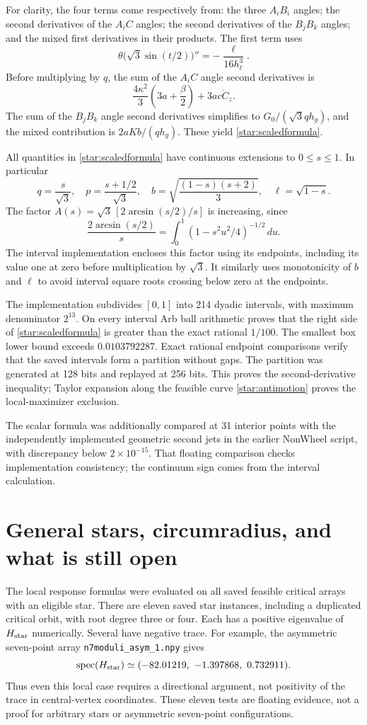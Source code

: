 \documentclass[11pt]{article}
\theoremstyle{remark}\newtheorem{remark}[theorem]{Remark}
\begin{document}
For clarity, the four terms come respectively from: the three
$A_iB_i$ angles; the second derivatives of the $A_iC$ angles; the
second derivatives of the $B_jB_k$ angles; and the mixed first
derivatives in their products. The first term uses
\[
 \theta\bigl(\sqrt3\sin(t/2)\bigr)''
 =-\frac{\ell}{16h_\ell^3}.
\]
Before multiplying by $q$, the sum of the $A_iC$ angle second
derivatives is
\[
 \frac{4\kappa^2}{3}\left(3a+\frac\beta2\right)
 +3ac\ddot C_z.
\]
The sum of the $B_jB_k$ angle second derivatives simplifies to
$G_0/(\sqrt3q h_g)$, and the mixed contribution is
$2aKb/(q h_g)$. These yield \eqref{star:scaledformula}.

All quantities in \eqref{star:scaledformula} have continuous extensions
to $0\leq s\leq1$. In particular
\[
 q=\frac{s}{\sqrt3},\quad p=\frac{s+1/2}{\sqrt3},\quad
 b=\sqrt{\frac{(1-s)(s+2)}3},\quad \ell=\sqrt{1-s}.
\]
The factor $A(s)=\sqrt3\,[2\arcsin(s/2)/s]$ is increasing, since
\[
 \frac{2\arcsin(s/2)}s
 =\int_0^1(1-s^2u^2/4)^{-1/2}\,du.
\]
The interval implementation encloses this factor using its endpoints,
including its value one at zero before multiplication by $\sqrt3$.
It similarly uses monotonicity of $b$ and $\ell$ to avoid interval
square roots crossing below zero at the endpoints.

The implementation subdivides $[0,1]$ into 214 dyadic intervals, with
maximum denominator $2^{13}$. On every interval Arb ball arithmetic
proves that the right side of \eqref{star:scaledformula} is greater than
the exact rational $1/100$. The smallest box lower bound exceeds
$0.0103792287$. Exact rational endpoint comparisons verify that the
saved intervals form a partition without gaps. The partition was
generated at 128 bits and replayed at 256 bits. This proves the
second-derivative inequality; Taylor expansion along the feasible
curve \eqref{star:antimotion} proves the local-maximizer exclusion.

The scalar formula was additionally compared at 31 interior points
with the independently implemented geometric second jets in the
earlier NonWheel script, with discrepancy below $2\times10^{-15}$.
That floating comparison checks implementation consistency; the
continuum sign comes from the interval calculation.

\section{General stars, circumradius, and what is still open}
The local response formulas were evaluated on all saved feasible
critical arrays with an eligible star. There are eleven saved
star instances, including a duplicated critical orbit, with root
degree three or four. Each has a positive eigenvalue of
$H_{\rm star}$ numerically. Several have negative trace. For example,
the asymmetric seven-point array \texttt{n7moduli\_asym\_1.npy} gives
\[
 \operatorname{spec}(H_{\rm star})\simeq
 (-82.01219,\ -1.397868,\ 0.732911).
\]
Thus even this local case requires a directional argument, not positivity
of the trace in central-vertex coordinates. These eleven tests are
floating evidence, not a proof for arbitrary stars or asymmetric
seven-point configurations.
\end{document}
